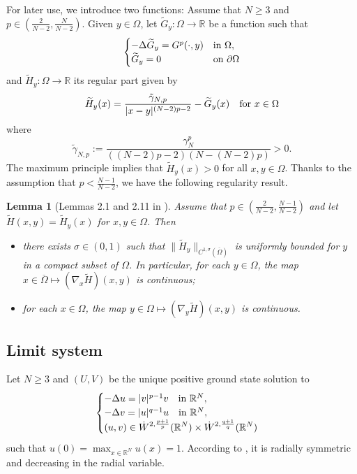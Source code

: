 \documentclass[reqno]{amsart}
\newtheorem{lemma}[theorem]{Lemma}
\theoremstyle{remark}
\newcommand{\pa}{\partial}
\newcommand{\ga}{\gamma}
\newcommand{\R}{\mathbb{R}}
\newcommand{\wtg}{\widetilde{G}}
\newcommand{\wth}{\widetilde{H}}
\renewcommand{\(}{\left(}
\renewcommand{\)}{\right)}
\numberwithin{equation}{section}
\begin{document}
For later use, we introduce two functions: Assume that $N \ge 3$ and $p \in (\frac{2}{N-2},\frac{N}{N-2})$. Given $y \in \Omega$, let $\wtg_y:\Omega \to \R$ be a function such that
$$
\begin{cases}
-\Delta \wtg_y = G^p(\cdot,y) &\textup{in } \Omega,\\
\wtg_y = 0 &\textup{on } \pa \Omega
\end{cases}
$$
and $\wth_y:\Omega \to \R$ its regular part given by
\begin{equation}\label{wth}
\wth_y(x) = \frac{\tilde{\ga}_{N,p}}{|x-y|^{(N-2)p-2}}-\wtg_y(x) \quad \textup{for } x \in \Omega
\end{equation}
where
\begin{equation}\label{tilde gamma}
\tilde{\ga}_{N,p} := \frac{\ga_N^p}{((N-2)p-2)(N-(N-2)p)} > 0.
\end{equation}
The maximum principle implies that $\wth_y(x) > 0$ for all $x,y \in \Omega$. Thanks to the assumption that $p <\frac{N-1}{N-2}$, we have the following regularity result.
\begin{lemma}[Lemmas 2.1 and 2.11 in \cite{KP}]\label{wth reg}
Assume that $p \in (\frac{2}{N-2},\frac{N-1}{N-2})$ and let $\wth(x,y) = \wth_y(x)$ for $x,y \in \Omega$. Then
\begin{itemize}
\item[-] there exists $\sigma \in (0,1)$ such that $\|\wth_y\|_{C^{1,\sigma}(\overline{\Omega})}$ is uniformly bounded for $y$ in a compact subset of $\Omega$.
    In particular, for each $y \in \Omega$, the map $x \in \overline{\Omega} \mapsto (\nabla_x \wth)(x,y)$ is continuous;
\item[-] for each $x \in \Omega$, the map $y \in \Omega \mapsto (\nabla_y \wth)(x,y)$ is continuous.
\end{itemize}
\end{lemma}


\subsection{Limit system}
Let $N \ge 3$ and $(U,V)$ be the unique positive ground state solution to
\begin{equation}\label{limit system}
\begin{cases}
-\Delta u=|v|^{p-1}v \quad \textup{in } \R^N,\\
-\Delta v=|u|^{q-1}u \quad \textup{in } \R^N,\\
\displaystyle (u,v)\in \dot{W}^{2,\frac{p+1}{p}}(\R^N)\times \dot{W}^{2,\frac{q+1}{q}}(\R^N)
\end{cases}
\end{equation}
such that $u(0)=\max_{x \in \R^N} u(x)=1$. According to \cite{ALT}, it is radially symmetric and decreasing in the radial variable.
\end{document}
